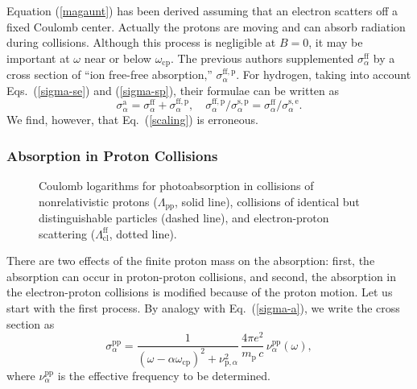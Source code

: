 \documentclass{emulateapj}
\newcommand{\beq}{\begin{equation}}
\newcommand{\eeq}{\end{equation}}
\newcommand{\req}[1]{Eq.\ (\ref{#1})}
\newcommand{\mpr}{m_\mathrm{p}}
\newcommand{\omp}{\omega_\mathrm{cp}}
\begin{document}
Equation (\ref{magaunt}) has been derived
assuming that an electron scatters off a fixed Coulomb center.
Actually the protons are moving and can absorb radiation
during collisions. Although this process is negligible at $B=0$,
it may be important
 at $\omega$ near or below $\omp$. 
The previous authors \citep{Pavlov95,Zane00,Zane01,Ozel01,HoLai}
supplemented $\sigma_\alpha^\mathrm{ff}$ by
 a cross section of ``ion free-free absorption,''
$\sigma_\alpha^\mathrm{ff,p}$. For hydrogen, taking into account 
Eqs.\ (\ref{sigma-se}) and (\ref{sigma-sp}), their formulae can be
written as
\beq
   \sigma_\alpha^\mathrm{a}=\sigma_\alpha^\mathrm{ff}
   +\sigma_\alpha^\mathrm{ff,p},
\quad
   \sigma_\alpha^{\mathrm{ff,p}} / \sigma_\alpha^\mathrm{s,p}
   = \sigma_\alpha^\mathrm{ff} / \sigma_\alpha^\mathrm{s,e} .
\label{scaling}
\eeq
We find, however, that \req{scaling} is erroneous.

       \subsubsection{Absorption in Proton Collisions}
%
\begin{figure}
\caption{Coulomb logarithms for photoabsorption
in collisions of nonrelativistic protons ($\Lambda_\mathrm{pp}$,
solid line),
collisions of identical but distinguishable particles (dashed line),
and electron-proton scattering 
($\Lambda_\mathrm{cl}^\mathrm{ff}$, dotted line).
\label{fig-qlpp}}
\end{figure}


There are two effects of the finite proton mass on the absorption:
first, the absorption can occur in proton-proton collisions,
and second, the absorption in the electron-proton collisions
is modified because of the proton motion. Let us start with
the first process. By analogy with \req{sigma-a}, we write
the cross section as
\beq
   \sigma_\alpha^\mathrm{pp} =
          \frac{1}{(\omega-\alpha\omp )^2
             +\nu_{\mathrm{p},\alpha}^2}\, 
          \frac{4\pi e^2
          }{ 
            {\mpr}\, c}\, \nu_{\alpha}^\mathrm{pp}(\omega) ,
\label{sigma-pp}
\eeq
where $\nu_{\alpha}^\mathrm{pp}$ is the effective frequency 
to be determined.
\end{document}
